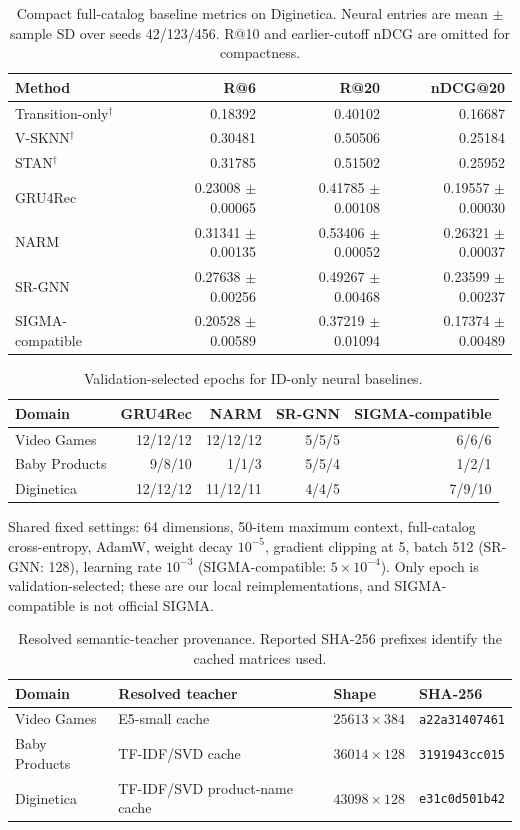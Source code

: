 \begin{table}[h]
\caption{Compact full-catalog baseline metrics on Diginetica. Neural entries are mean $\pm$ sample SD over seeds 42/123/456. R@10 and earlier-cutoff nDCG are omitted for compactness.}
\centering\scriptsize
\begin{tabular}{lrrr}
\toprule
Method & R@6 & R@20 & nDCG@20\\
\midrule
Transition-only$^\dagger$ & 0.18392 & 0.40102 & 0.16687\\
V-SKNN$^\dagger$ & 0.30481 & 0.50506 & 0.25184\\
STAN$^\dagger$ & 0.31785 & 0.51502 & 0.25952\\
GRU4Rec & 0.23008 $\pm$ 0.00065 & 0.41785 $\pm$ 0.00108 & 0.19557 $\pm$ 0.00030\\
NARM & 0.31341 $\pm$ 0.00135 & 0.53406 $\pm$ 0.00052 & 0.26321 $\pm$ 0.00037\\
SR-GNN & 0.27638 $\pm$ 0.00256 & 0.49267 $\pm$ 0.00468 & 0.23599 $\pm$ 0.00237\\
SIGMA-compatible & 0.20528 $\pm$ 0.00589 & 0.37219 $\pm$ 0.01094 & 0.17374 $\pm$ 0.00489\\
\bottomrule
\end{tabular}
\end{table}

\begin{table}[h]
\caption{Validation-selected epochs for ID-only neural baselines.}
\centering\scriptsize
\begin{tabular}{lrrrr}
\toprule
Domain & GRU4Rec & NARM & SR-GNN & SIGMA-compatible\\
\midrule
Video Games & 12/12/12 & 12/12/12 & 5/5/5 & 6/6/6\\
Baby Products & 9/8/10 & 1/1/3 & 5/5/4 & 1/2/1\\
Diginetica & 12/12/12 & 11/12/11 & 4/4/5 & 7/9/10\\
\bottomrule
\end{tabular}
\par\smallskip\scriptsize Shared fixed settings: 64 dimensions, 50-item maximum context, full-catalog cross-entropy, AdamW, weight decay $10^{-5}$, gradient clipping at 5, batch 512 (SR-GNN: 128), learning rate $10^{-3}$ (SIGMA-compatible: $5\!\times\!10^{-4}$).  Only epoch is validation-selected; these are our local reimplementations, and SIGMA-compatible is not official SIGMA.
\end{table}

\begin{table}[h]
\caption{Resolved semantic-teacher provenance. Reported SHA-256 prefixes identify the cached matrices used.}
\centering\small
\begin{tabular}{lp{}ll}
\toprule
Domain & Resolved teacher & Shape & SHA-256\\
\midrule
Video Games & E5-small cache & $25613\times384$ & \texttt{a22a31407461}\\
Baby Products & TF-IDF/SVD cache & $36014\times128$ & \texttt{3191943cc015}\\
Diginetica & TF-IDF/SVD product-name cache & $43098\times128$ & \texttt{e31c0d501b42}\\
\bottomrule
\end{tabular}
\end{table}


